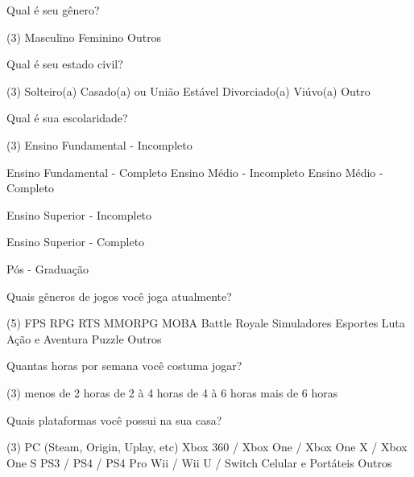 \documentclass[11pt,a4paper]{article}
\begin{document}
\begin{question}
	Qual é seu gênero?
	\begin{tasks}(3)
		\task Masculino
		\task Feminino
		\task Outros
	\end{tasks}
\end{question}

\begin{question}
	Qual é seu estado civil?
	\begin{tasks}(3)
	\task Solteiro(a)
	\task Casado(a) ou União Estável
	\task Divorciado(a)
	\task Viúvo(a)
	\task Outro
	\end{tasks}
\end{question}

\begin{question}
 	Qual é sua escolaridade?
	\begin{tasks}(3)
	\task Ensino Fundamental - Incompleto
	
	\task Ensino Fundamental - Completo
	\task Ensino Médio - Incompleto
	\task Ensino Médio - Completo
	
	\task Ensino Superior - Incompleto
	
	\task Ensino Superior - Completo
	
	\task Pós - Graduação
	\end{tasks}
\end{question}
\begin{question}
 	Quais gêneros de jogos você joga atualmente?
	\begin{tasks}(5)
	\task FPS
	\task RPG
	\task RTS
	\task MMORPG
	\task MOBA
	\task Battle Royale
	\task Simuladores
	\task Esportes
	\task Luta
	\task Ação e Aventura
	\task Puzzle
	\task Outros
	\end{tasks}
\end{question}
\begin{question}
	Quantas horas por semana você costuma jogar?
	\begin{tasks}(3)
	\task menos de 2 horas
	\task de 2 à 4 horas
	\task de 4 à 6 horas
	\task mais de 6 horas
	\end{tasks}
\end{question}
\begin{question}
	Quais plataformas você possui na sua casa?
	\begin{tasks}(3)
	\task PC (Steam, Origin, Uplay, etc)
	\task Xbox 360 / Xbox One / Xbox One X / Xbox One S
	\task PS3 / PS4 / PS4 Pro
	\task Wii / Wii U / Switch
	\task Celular e Portáteis
	\task Outros
	\end{tasks}
\end{question}
\end{document}
